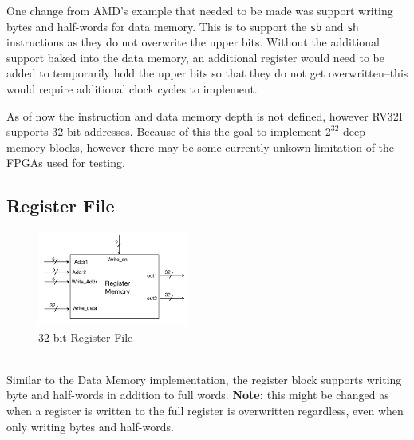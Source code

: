 \documentclass[lettersize,journal]{IEEEtran}
\begin{document}
\begin{itemize}
One change from AMD's example that needed to be made was support writing bytes and half-words for data memory.
This is to support the \verb|sb| and \verb|sh| instructions as they do not overwrite the upper bits.
Without the additional support baked into the data memory,
an additional register would need to be added to temporarily hold the upper bits so that they do not get overwritten--this would require additional clock cycles to implement.

As of now the instruction and data memory depth is not defined, however RV32I supports 32-bit addresses.
Because of this the goal to implement $2^{32}$ deep memory blocks, however there may be some currently unkown limitation of the FPGAs used for testing.

\subsection{Register File}
\begin{figure}[!h]
    \label{fig:regblock}
    \centering
    \includegraphics[width=5cm]{CPTR380_registers.png}
    \caption{32-bit Register File}
\end{figure}
\color{red}{Incomplete..}\color{black}\\
Similar to the Data Memory implementation, the register block supports writing byte and half-words in addition to full words.
\textbf{Note:} this might be changed as when a register is written to the full register is overwritten regardless, even when only writing bytes and half-words.


\end{itemize}
\end{document}
